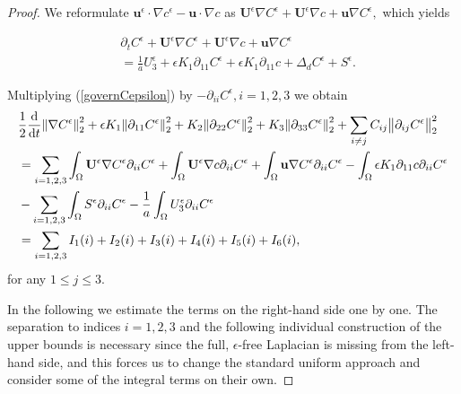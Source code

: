 \documentclass[12pt]{report}
\numberwithin{theorem}{chapter}
\numberwithin{corollary}{chapter}
\numberwithin{lemma}{chapter}
\numberwithin{remark}{chapter}
\numberwithin{definition}{chapter}
\numberwithin{prop}{chapter}
\newcommand*\diff{\mathop{}\!\mathrm{d}}
\begin{document}
\begin{proof}
We reformulate $\mathbf{u}^\epsilon \cdot \nabla c^\epsilon - \mathbf{u} \cdot \nabla c$ as $\mathbf{U}^\epsilon \nabla C^\epsilon  + \mathbf{U}^\epsilon \nabla c+ \mathbf{u} \nabla C^\epsilon,$ which yields

\begin{equation} \label{governCepsilon}
  \begin{split}
   & \partial_t C^\epsilon + \mathbf{U}^\epsilon \nabla C^\epsilon  + \mathbf{U}^\epsilon \nabla c+ \mathbf{u} \nabla C^\epsilon \\
   & = \frac{1}{a} U_3^\epsilon + \epsilon K_1 \partial_{11} C^\epsilon + \epsilon K_1 \partial_{11} c + \Delta_d C^\epsilon + S^\epsilon.
   \end{split}
\end{equation}

Multiplying (\ref{governCepsilon}) by $- \partial_{ii} C^\epsilon, i=1,2,3$ we obtain
%
\begin{equation}
  \begin{split}
      & \frac{1}{2}\frac{\diff}{\diff t} \norm{\nabla C^\epsilon}_2^2 + \epsilon K_1 \norm{\partial_{11} C^\epsilon}_2^2 + K_2 \norm{\partial_{22} C^\epsilon}_2^2 + K_3 \norm{\partial_{33} C^\epsilon}_2^2 + \sum_{i \neq j} C_{ij} \norm{\partial_{ij} C^\epsilon}_2^2 \\
      & = \sum_{i = 1,2,3} \int_\Omega \mathbf{U}^\epsilon \nabla C^\epsilon \partial_{ii} C^\epsilon + \int_\Omega \mathbf{U}^\epsilon \nabla c \partial_{ii} C^\epsilon + \int_\Omega \mathbf{u} \nabla C^\epsilon \partial_{ii} C^\epsilon - \int_\Omega \epsilon K_1 \partial_{11} c \partial_{ii} C^\epsilon \\
      & - \sum_{i = 1,2,3} \int_\Omega S^\epsilon \partial_{ii} C^\epsilon - \frac{1}{a} \int_\Omega U_3^\epsilon \partial_{ii} C^\epsilon \\
      & = \sum_{i = 1,2,3} I_1(i)  + I_2(i) + I_3(i) + I_4(i) + I_5(i) + I_6(i),
  \end{split}
\end{equation}
%
for any $1 \leq j \leq 3.$

In the following we estimate the terms on the right-hand side one by one. The separation to indices $i = 1,2,3$ and the following individual construction of the upper bounds is necessary since the full, $\epsilon$-free Laplacian is missing from the left-hand side, and this forces us to change the standard uniform approach and consider some of the integral terms on their own.

\bigskip


\end{proof}
\end{document}
